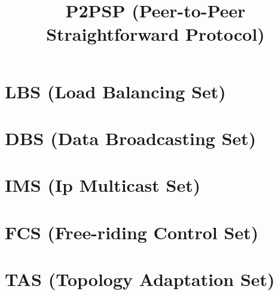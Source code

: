 
\newcommand{\note}[1]{#1}


\newenvironment{notex}
               {\textbf{Note:}
               }
               {
               }

\title{P2PSP (Peer-to-Peer Straightforward Protocol)}
\maketitle

\begin{abstract}

\end{abstract}

\tableofcontents

\section{LBS (Load Balancing Set)}


\section{DBS (Data Broadcasting Set)}


\section{IMS (Ip Multicast Set)}


\section{FCS (Free-riding Control Set)}


\section{TAS (Topology Adaptation Set)}


